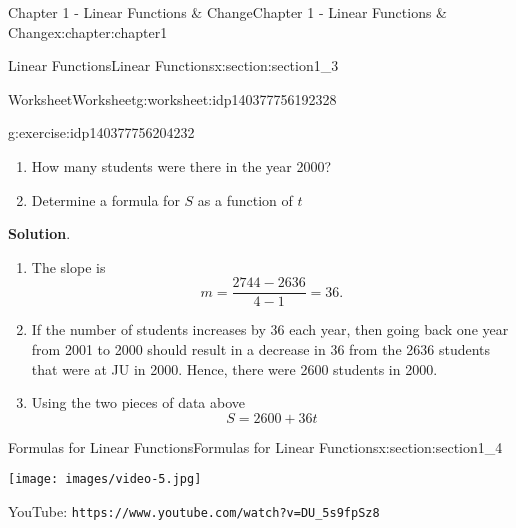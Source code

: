 \documentclass[oneside,10pt,]{book}
\newcommand{\blocktitlefont}{\relax}
\newcommand{\mono}[1]{\texttt{#1}}
\newlength{\qrsize}
\newlength{\previewwidth}
\begin{document}
\begin{chapterptx}{Chapter 1 - Linear Functions \& Change}{}{Chapter 1 - Linear Functions \& Change}{}{}{x:chapter:chapter1}
\begin{sectionptx}{Linear Functions}{}{Linear Functions}{}{}{x:section:section1_3}
\begin{worksheet-subsection}{Worksheet}{}{Worksheet}{}{}{g:worksheet:idp140377756192328}
\begin{divisionexercise}{2}{}{}{g:exercise:idp140377756204232}
\begin{enumerate}[label=(\alph*)]
\item{}How many students were there in the year 2000?%
\item{}Determine a formula for \(S\) as a function of \(t\)%
\end{enumerate}
\textbf{\blocktitlefont Solution}.\hypertarget{g:solution:idp140377756208408}{}\quad{}%
\begin{enumerate}[label=(\alph*)]
\item{}The slope is%
%
\begin{equation*}
m = \frac{2744-2636}{4-1} = 36. 
\end{equation*}
\item{}If the number of students increases by 36 each year, then going back one year from 2001 to 2000 should result in a decrease in 36 from the 2636 students that were at JU in 2000. Hence, there were 2600 students in 2000.%
\item{}Using the two pieces of data above%
%
\begin{equation*}
S = 2600+36t 
\end{equation*}
\end{enumerate}
\end{divisionexercise}%
\end{worksheet-subsection}
\restoregeometry
\end{sectionptx}
%
%
\typeout{************************************************}
\typeout{************************************************}
%
\begin{sectionptx}{Formulas for Linear Functions}{}{Formulas for Linear Functions}{}{}{x:section:section1_4}
\setlength{\qrsize}{9em}
\setlength{\previewwidth}{\linewidth}
\addtolength{\previewwidth}{-\qrsize}
\begin{tcbraster}[raster columns=2, raster column skip=1pt, raster halign=center, raster force size=false, raster left skip=0pt, raster right skip=0pt]%
\begin{tcolorbox}[previewstyle, width=\previewwidth]%
\texttt{[image: images/video-5.jpg]}%
\end{tcolorbox}%
\begin{tcolorbox}[qrstyle]%
{\hypersetup{urlcolor=black}}%
\end{tcolorbox}%
\begin{tcolorbox}[captionstyle]%
\small YouTube: \mono{https://www.youtube.com/watch?v=DU\_5s9fpSz8}\end{tcolorbox}%

\end{tcbraster}
\end{sectionptx}
\end{chapterptx}
\end{document}
